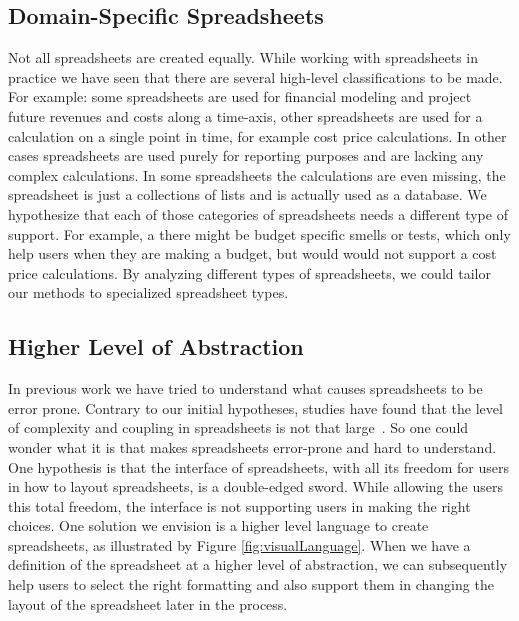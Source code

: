 \documentclass[conference]{IEEEtran}
\begin{document}
\subsection{Domain-Specific Spreadsheets}
Not all spreadsheets are created equally. While working with spreadsheets in practice we have seen that there are several high-level classifications to be made. For example: some spreadsheets are used for financial modeling and project future revenues and costs along a time-axis, other spreadsheets are used for a calculation on a single point in time, for example cost price calculations. In other cases spreadsheets are used purely for reporting purposes and are lacking any complex calculations. In some spreadsheets the calculations are even missing, the spreadsheet is just a collections of lists and is actually used as a database. We hypothesize that each of those categories of spreadsheets needs a different type of support. For example, a there might be budget specific smells or tests, which only help users when they are making a budget, but would would not support a cost price calculations. By analyzing different types of spreadsheets, we could tailor our methods to specialized spreadsheet types.

\subsection{Higher Level of Abstraction}
In previous work we have tried to understand what causes spreadsheets to be error prone. Contrary to our initial hypotheses, studies have found that the level of complexity and coupling in spreadsheets is not that large~\cite{Jansen2015}. So one could wonder what it is that makes spreadsheets error-prone and hard to understand. One hypothesis is that the interface of spreadsheets, with all its freedom for users in how to layout spreadsheets, is a double-edged sword. While allowing the users this total freedom, the interface is not supporting users in making the right choices. One solution we envision is a higher level language to create spreadsheets, as illustrated by Figure \ref{fig:visualLanguage}. When we have a definition of the spreadsheet at a higher level of abstraction, we can subsequently help users to select the right formatting and also support them in changing the layout of the spreadsheet later in the process. 
\end{document}

